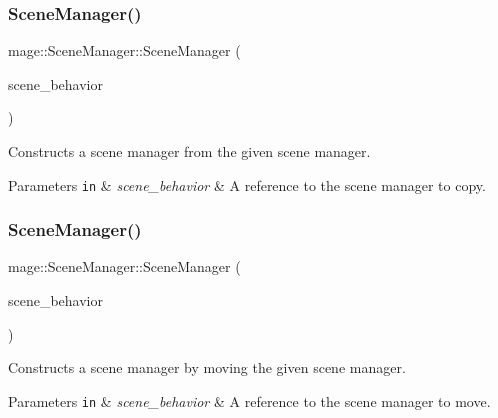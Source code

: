 \subsubsection{\texorpdfstring{Scene\+Manager()}{SceneManager()}\hspace{0.1cm}{\footnotesize\ttfamily [2/3]}}
{\footnotesize\ttfamily mage\+::\+Scene\+Manager\+::\+Scene\+Manager (\begin{DoxyParamCaption}\item[{const \hyperlink{classmage_1_1_scene_manager}{Scene\+Manager} \&}]{scene\+\_\+behavior }\end{DoxyParamCaption})\hspace{0.3cm}{\ttfamily [delete]}}

Constructs a scene manager from the given scene manager.


\begin{DoxyParams}[1]{Parameters}
\mbox{\tt in}  & {\em scene\+\_\+behavior} & A reference to the scene manager to copy. \\
\hline
\end{DoxyParams}
\hypertarget{classmage_1_1_scene_manager_ae8f4c6553e27b0bc00f0ea40f0e3770c}{}\label{classmage_1_1_scene_manager_ae8f4c6553e27b0bc00f0ea40f0e3770c} 
\subsubsection{\texorpdfstring{Scene\+Manager()}{SceneManager()}\hspace{0.1cm}{\footnotesize\ttfamily [3/3]}}
{\footnotesize\ttfamily mage\+::\+Scene\+Manager\+::\+Scene\+Manager (\begin{DoxyParamCaption}\item[{\hyperlink{classmage_1_1_scene_manager}{Scene\+Manager} \&\&}]{scene\+\_\+behavior }\end{DoxyParamCaption})\hspace{0.3cm}{\ttfamily [default]}}

Constructs a scene manager by moving the given scene manager.


\begin{DoxyParams}[1]{Parameters}
\mbox{\tt in}  & {\em scene\+\_\+behavior} & A reference to the scene manager to move. \\
\hline
\end{DoxyParams}
\hypertarget{classmage_1_1_scene_manager_a849386b052d6ae8945c9554f888e1707}{}\label{classmage_1_1_scene_manager_a849386b052d6ae8945c9554f888e1707} 
